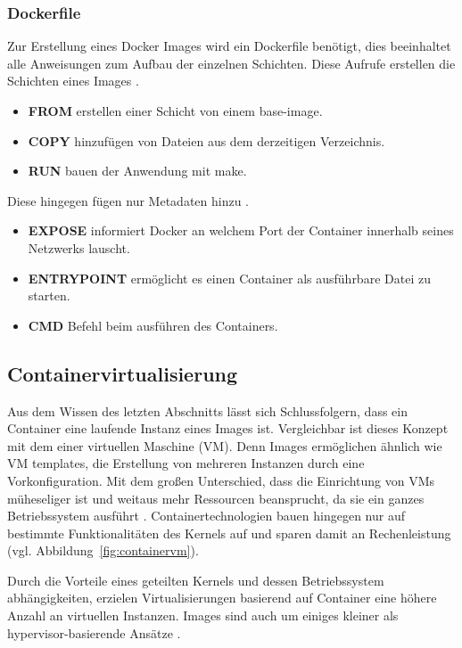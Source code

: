 \subsubsection{Dockerfile}
Zur Erstellung eines Docker Images wird ein Dockerfile benötigt, dies beeinhaltet alle Anweisungen
zum Aufbau der einzelnen Schichten. 
Diese Aufrufe erstellen die Schichten eines Images \cite{dockerbestpracticedockerfile}.
\begin{itemize}
    \item \textbf{FROM} erstellen einer Schicht von einem base-image. 
    \item \textbf{COPY} hinzufügen von Dateien aus dem derzeitigen Verzeichnis. 
    \item \textbf{RUN} bauen der Anwendung mit make. 
\end{itemize}
Diese hingegen fügen nur Metadaten hinzu \cite{dockerbestpracticedockerfile}.
\begin{itemize}
    \item \textbf{EXPOSE} informiert Docker an welchem Port der Container innerhalb seines Netzwerks lauscht.
    \item \textbf{ENTRYPOINT} ermöglicht es einen Container als ausführbare Datei zu starten.
    \item \textbf{CMD} Befehl beim ausführen des Containers.
\end{itemize}


\subsection{Containervirtualisierung}
Aus dem Wissen des letzten Abschnitts lässt sich Schlussfolgern, dass
ein Container eine laufende Instanz eines Images ist.
Vergleichbar ist dieses Konzept mit dem einer virtuellen Maschine (VM).
Denn Images ermöglichen ähnlich wie VM templates, die Erstellung von mehreren Instanzen durch eine Vorkonfiguration.
Mit dem großen Unterschied, dass die Einrichtung von VMs müheseliger ist und weitaus mehr Ressourcen
beansprucht, da sie ein ganzes Betriebssystem ausführt \cite{hypervisorcontainer}. Containertechnologien bauen hingegen nur auf 
bestimmte Funktionalitäten des Kernels auf und sparen damit an Rechenleistung (vgl. Abbildung~\ref{fig:containervm}).

Durch die Vorteile eines geteilten Kernels und dessen Betriebssystem abhängigkeiten,
erzielen Virtualisierungen basierend auf Container eine höhere Anzahl an 
virtuellen Instanzen. Images sind auch um einiges kleiner als hypervisor-basierende
Ansätze \cite{hypervisorcontainer}.

